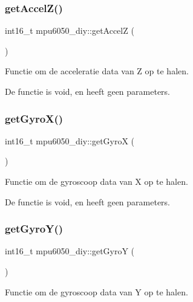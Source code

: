 \subsubsection{\texorpdfstring{get\+Accel\+Z()}{getAccelZ()}}
{\footnotesize\ttfamily int16\+\_\+t mpu6050\+\_\+diy\+::get\+AccelZ (\begin{DoxyParamCaption}{ }\end{DoxyParamCaption})\hspace{0.3cm}{\ttfamily [inline]}}



Functie om de acceleratie data van Z op te halen. 

De functie is void, en heeft geen parameters. \mbox{\label{classmpu6050__diy_a048c65dd8d76a6296278764fa186ab14}} 
\subsubsection{\texorpdfstring{get\+Gyro\+X()}{getGyroX()}}
{\footnotesize\ttfamily int16\+\_\+t mpu6050\+\_\+diy\+::get\+GyroX (\begin{DoxyParamCaption}{ }\end{DoxyParamCaption})\hspace{0.3cm}{\ttfamily [inline]}}



Functie om de gyroscoop data van X op te halen. 

De functie is void, en heeft geen parameters. \mbox{\label{classmpu6050__diy_af83663d474f4d05b06517cc50faad681}} 
\subsubsection{\texorpdfstring{get\+Gyro\+Y()}{getGyroY()}}
{\footnotesize\ttfamily int16\+\_\+t mpu6050\+\_\+diy\+::get\+GyroY (\begin{DoxyParamCaption}{ }\end{DoxyParamCaption})\hspace{0.3cm}{\ttfamily [inline]}}



Functie om de gyroscoop data van Y op te halen. 

